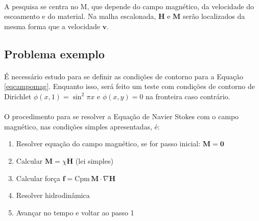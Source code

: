 \documentclass[eletromagnetismo.tex]{subfiles}
\begin{document}
\paragraph{} A pesquisa se centra no $\mathrm{M}$, que depende do campo magnético, da velocidade do escoamento e do material. Na malha escalonada, $\mathbf{H}$ e $\mathbf{M}$ serão localizados da mesma forma que a velocidade $\mathbf{v}$.

\subsection{Problema exemplo}
\paragraph{} É necessário estudo para se definir as condições de contorno para a Equação \ref{eqcampomag}. Enquanto isso, será feito um teste com condições de contorno de Dirichlet $\phi(x,1) = \sin^2\pi x$ e $\phi(x,y)=0$ na fronteira caso contrário.

\paragraph{} O procedimento para se resolver a Equação de Navier Stokes com o campo magnético, nas condições simples apresentadas, é:

\begin{enumerate}
	\item Resolver equação do campo magnético, se for passo inicial: $\mathbf{M} = \mathbf{0}$
	\item Calcular $\mathbf{M} = \chi \mathbf{H}$ (lei simples)
	\item Calcular força $\mathbf{f} = \mathrm{Cpm}\,\mathbf{M}\cdot \nabla \mathbf{H}$
	\item Resolver hidrodinâmica
	\item Avançar no tempo e voltar ao passo 1
\end{enumerate}
\end{document}

